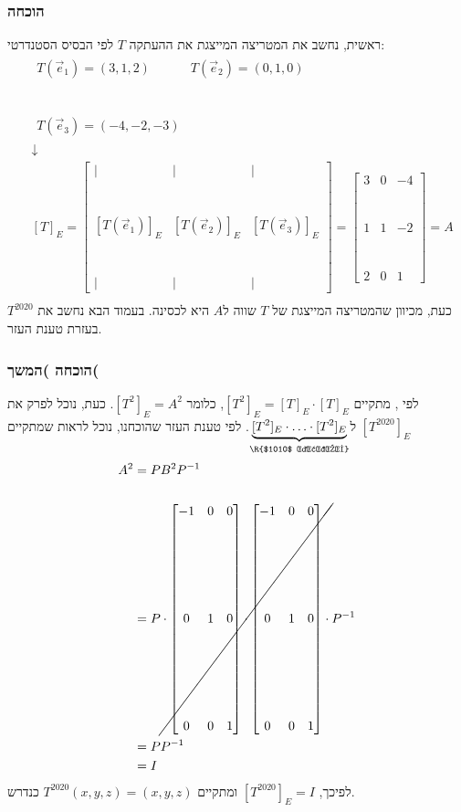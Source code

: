 \documentclass[11pt, oneside]{article}
\newcommand{\qed}{\R{$\blacksquare$}}
\newcommand{\br}{\\\\\\\\\\\\\\}
\newcommand{\m}[3]{\R{משפט #3#2.#1}}
\begin{document}
\subsubsection{הוכחה}
ראשית, נחשב את המטריצה המייצגת את ההעתקה $T$ לפי הבסיס הסטנדרטי:
\begin{eqnarray*}
& \begin{matrix}
T(\vec{e}_1) = (3, 1, 2) & T(\vec{e}_2) = (0, 1, 0)\br
T(\vec{e}_3) = (-4, -2, -3)
\end{matrix}\\
& \downarrow\\
& [T]_E = \begin{bmatrix}
\mid & \mid & \mid\br
{[T(\vec{e}_1)]_E} & {[T(\vec{e}_2)]_E} & {[T(\vec{e}_3)]_E}\br
\mid & \mid & \mid
\end{bmatrix} = \begin{bmatrix}
3 & 0 & -4\br
1 & 1 & -2\br
2 & 0 & 1
\end{bmatrix} = A\\
\end{eqnarray*}
כעת, מכיוון שהמטריצה המייצגת של $T$ שווה ל$A$ היא לכסינה. בעמוד הבא נחשב את $T^{2020}$ בעזרת טענת העזר.
\clearpage

\setcounter{subsubsection}{1}
\subsubsection{הוכחה )המשך(}
לפי \m{01}{4}{1.}, מתקיים $[T^2]_E = [T]_E \cdot [T]_E$, כלומר $[T^2]_E = A^2$. כעת, נוכל לפרק את $[T^{2020}]_E$ ל$\underbrace{[T^2]_E \cdot \ldots \cdot [T^2]_E}_{\text{\R{$1010$ פעמים}}}$. לפי טענת העזר שהוכחנו, נוכל לראות שמתקיים
\begin{align*}
A^2
& = PB^{2}P^{-1}\\\\
& = P \cdot \cancel{\begin{bmatrix}
-1 & 0 & 0\br
0 & 1 & 0\br
0 & 0 & 1
\end{bmatrix} \cdot \begin{bmatrix}
-1 & 0 & 0\br
0 & 1 & 0\br
0 & 0 & 1
\end{bmatrix}} \cdot P^{-1}\\
& = PP^{-1}\\
& = I
\end{align*}
לפיכך, $[T^{2020}]_E = I$ ומתקיים $T^{2020}(x, y, z) = (x, y, z)$ כנדרש.
\br\qed

\end{document}
